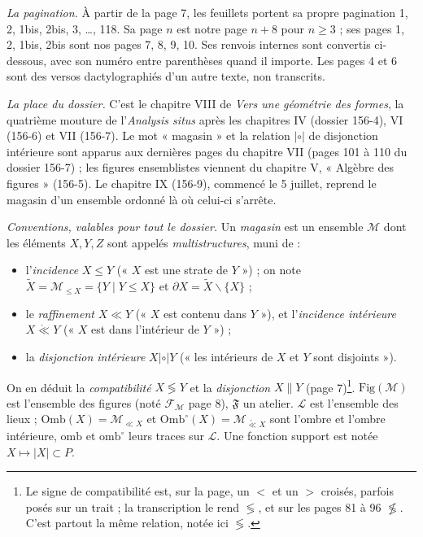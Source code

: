 \documentclass[11pt,a4paper]{article}
\begin{document}
\emph{La pagination.} À partir de la page 7, les feuillets portent sa propre
pagination 1, 2, 1bis, 2bis, 3, \ldots, 118. Sa page $n$ est notre page
$n + 8$ pour $n \geq 3$ ; ses pages 1, 2, 1bis, 2bis sont nos pages 7, 8, 9,
10. Ses renvois internes sont convertis ci-dessous, avec son numéro entre
parenthèses quand il importe. Les pages 4 et 6 sont des versos dactylographiés
d'un autre texte, non transcrits.

\emph{La place du dossier.} C'est le chapitre VIII de \emph{Vers une géométrie
des formes}, la quatrième mouture de l'\emph{Analysis situs} après les
chapitres IV (dossier 156-4), VI (156-6) et VII (156-7). Le mot « magasin » et
la relation $\mathrel{|\circ|}$ de disjonction intérieure sont apparus aux
dernières pages du chapitre VII (pages 101 à 110 du dossier 156-7) ; les
figures ensemblistes viennent du chapitre V, « Algèbre des figures » (156-5).
Le chapitre IX (156-9), commencé le 5 juillet, reprend le magasin d'un
ensemble ordonné là où celui-ci s'arrête.

\emph{Conventions, valables pour tout le dossier.} Un \emph{magasin} est un
ensemble $\mathcal{M}$ dont les éléments $X, Y, Z$ sont appelés
\emph{multistructures}, muni de :
\begin{itemize}
\item[--] l'\emph{incidence} $X \leq Y$ (« $X$ est une strate de $Y$ ») ; on
note $\widetilde{X} = \mathcal{M}_{\leq X} = \{Y \mid Y \leq X\}$ et
$\partial X = \widetilde{X} \smallsetminus \{X\}$ ;
\item[--] le \emph{raffinement} $X \ll Y$ (« $X$ est contenu dans $Y$ »), et
l'\emph{incidence intérieure} $X \mathrel{\mathring{\ll}} Y$ (« $X$ est dans
l'intérieur de $Y$ ») ;
\item[--] la \emph{disjonction intérieure} $X \mathrel{|\circ|} Y$ (« les
intérieurs de $X$ et $Y$ sont disjoints »).
\end{itemize}
On en déduit la \emph{compatibilité} $X \lessgtr Y$ et la \emph{disjonction}
$X \parallel Y$ (page 7)\footnote{Le signe de compatibilité est, sur la page,
un $<$ et un $>$ croisés, parfois posés sur un trait ; la transcription le rend
$\lessgtr$, et sur les pages 81 à 96 $\not\lessgtr$. C'est partout la même
relation, notée ici $\lessgtr$.}. $\mathrm{Fig}(\mathcal{M})$ est l'ensemble des
figures (noté $\mathcal{F}_{\mathcal{M}}$ page 8), $\mathfrak{F}$ un atelier.
$\mathcal{L}$ est l'ensemble des lieux ; $\mathrm{Omb}(X) =
\mathcal{M}_{\ll X}$ et $\mathrm{Omb}^{\circ}(X) = \mathcal{M}_{\mathring{\ll}
X}$ sont l'ombre et l'ombre intérieure, $\mathrm{omb}$ et $\mathrm{omb}^{\circ}$
leurs traces sur $\mathcal{L}$. Une fonction support est notée $X \mapsto |X|
\subset P$.
\end{document}
